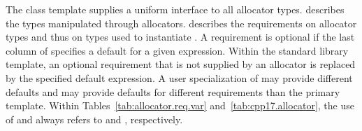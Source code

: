 \pnum
The class template  supplies
a uniform interface to all allocator types.
 describes the types manipulated
through allocators. 
describes the requirements on allocator types
and thus on types used to instantiate . A requirement
is optional if the last column of
 specifies a default for a
given expression. Within the standard library 
template, an optional requirement that is not supplied by an allocator is
replaced by the specified default expression. A user specialization of
 may provide different defaults and may provide
defaults for different requirements than the primary template. Within
Tables~\ref{tab:allocator.req.var} and~\ref{tab:cpp17.allocator},
the use of  and  always refers to 
and , respectively.


